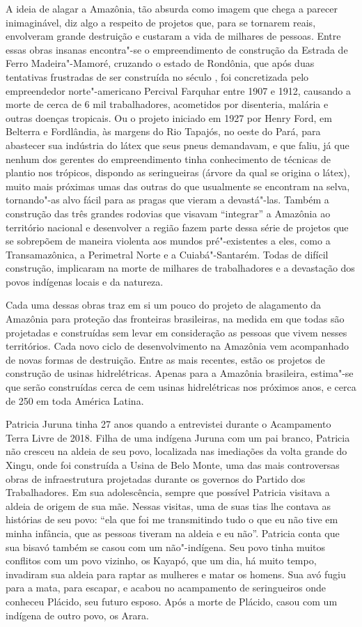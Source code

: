 A ideia de alagar a Amazônia, tão absurda como imagem que chega a parecer inimaginável, diz algo a respeito de projetos que, para se tornarem
reais, envolveram grande destruição e custaram a vida de milhares de
pessoas. Entre essas obras insanas encontra"-se o empreendimento de
construção da Estrada de Ferro Madeira"-Mamoré, cruzando o estado de
Rondônia, que após duas tentativas frustradas de ser construída no
século , foi concretizada pelo empreendedor norte"-americano Percival
Farquhar entre 1907 e 1912, causando a morte de cerca de 6 mil
trabalhadores, acometidos por disenteria, malária e outras doenças
tropicais. Ou o projeto iniciado em 1927 por Henry Ford, em Belterra
e Fordlândia, às margens do Rio Tapajós, no oeste do Pará, para
abastecer sua indústria do látex que seus pneus demandavam, e que faliu,
já que nenhum dos gerentes do empreendimento tinha conhecimento de
técnicas de plantio nos trópicos, dispondo as seringueiras (árvore da
qual se origina o látex), muito mais próximas umas das outras do que
usualmente se encontram na selva, tornando"-as alvo fácil para as pragas
que vieram a devastá"-las. Também a construção das três grandes rodovias
que visavam ``integrar'' a Amazônia ao território nacional e desenvolver a
região fazem parte dessa série de projetos que se sobrepõem de maneira
violenta aos mundos pré"-existentes a eles, como a Transamazônica, a
Perimetral Norte e a Cuiabá"-Santarém. Todas de difícil construção,
implicaram na morte de milhares de trabalhadores e a devastação dos
povos indígenas locais e da natureza.

Cada uma dessas obras traz em si um pouco do projeto de alagamento da
Amazônia para proteção das fronteiras brasileiras, na medida em que
todas são projetadas e construídas sem levar em consideração as pessoas
que vivem nesses territórios. Cada novo ciclo de desenvolvimento na
Amazônia vem acompanhado de novas formas de destruição. Entre as mais
recentes, estão os projetos de construção de usinas hidrelétricas.
Apenas para a Amazônia brasileira, estima"-se que serão
construídas cerca de cem usinas hidrelétricas nos próximos anos, e cerca
de 250 em toda América Latina.

Patricia Juruna tinha 27 anos quando a entrevistei durante o Acampamento
Terra Livre de 2018. Filha de uma indígena Juruna com um pai branco,
Patricia não cresceu na aldeia de seu povo, localizada nas imediações da
volta grande do Xingu, onde foi construída a Usina de Belo Monte, uma
das mais controversas obras de infraestrutura projetadas durante os
governos do Partido dos Trabalhadores. Em sua adolescência, sempre que
possível Patricia visitava a aldeia de origem de sua mãe. Nessas
visitas, uma de suas tias lhe contava as histórias de seu povo: ``ela
que foi me transmitindo tudo o que eu não tive em minha infância, que as
pessoas tiveram na aldeia e eu não''. Patricia conta que sua bisavó
também se casou com um não"-indígena. Seu povo tinha muitos conflitos com
um povo vizinho, os Kayapó, que um dia, há muito tempo, invadiram sua
aldeia para raptar as mulheres e matar os homens. Sua avó fugiu para a
mata, para escapar, e acabou no acampamento de seringueiros onde
conheceu Plácido, seu futuro esposo. Após a morte de Plácido, casou com
um indígena de outro povo, os Arara.

